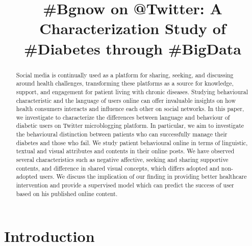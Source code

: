 \documentclass{acm_proc_article-sp}
\begin{document}
\title{\#Bgnow on @Twitter: A Characterization Study of \#Diabetes through \#BigData}
\maketitle
\begin{abstract}
Social media is continually used as a platform for sharing, seeking, and discussing around health challenges, transforming these platforms as a source for knowledge, support, and engagement for patient living with chronic diseases. Studying behavioural characteristic and the language of users online can offer invaluable insights on how health consumers interacts and influence each other on social networks. In this paper, we investigate to characterize the differences between language and behaviour of diabetic users on Twitter microblogging platform. In particular, we aim to investigate the behavioural distinction between patients who can successfully manage their diabetes and those who fail. We study patient behavioural online in terms of linguistic, textual and visual attributes and contents in their online posts. We have observed several characteristics such as negative affective, seeking and sharing supportive contents, and difference in shared visual concepts, which differs adopted and non-adopted users. We discuss the implication of our finding in providing better healthcare intervention and provide a supervised model which can predict the success of user based on his published online content.

\end{abstract}





\section{Introduction}
\end{document}
